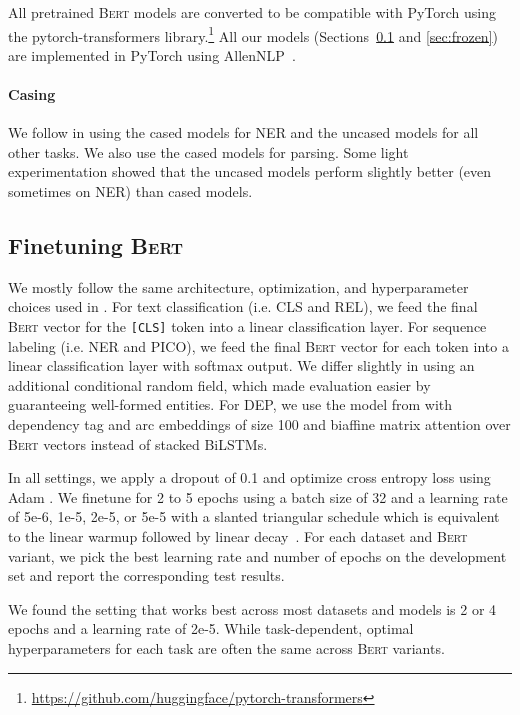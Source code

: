 \documentclass[11pt,a4paper]{article}
\newcommand{\bert}{\textsc{Bert}\xspace}
\begin{document}
All pretrained \bert models are converted to be compatible with PyTorch using the pytorch-transformers library.\footnote{\url{https://github.com/huggingface/pytorch-transformers}}  All our models (Sections~\ref{sec:finetune} and \ref{sec:frozen}) are implemented in PyTorch using AllenNLP~\cite{Gardner2017AllenNLP}.  

\paragraph{Casing}
We follow \citet{Devlin2018BERTPO} in using the cased models for NER and the uncased models for all other tasks.  We also use the cased models for parsing.  Some light experimentation showed that the uncased models perform slightly better (even sometimes on NER) than cased models.


\subsection{Finetuning \bert}
\label{sec:finetune}

We mostly follow the same architecture, optimization, and hyperparameter choices used in \citet{Devlin2018BERTPO}.  For text classification (i.e. CLS and REL), we feed the final \bert vector for the \texttt{[CLS]} token into a linear classification layer.  For sequence labeling (i.e. NER and PICO), we feed the final \bert vector for each token into a linear classification layer with softmax output.  We differ slightly in using an additional conditional random field, which made evaluation easier by guaranteeing well-formed entities.  For DEP, we use the model from \citet{Dozat2017DeepBA} with dependency tag and arc embeddings of size 100 and biaffine matrix attention over \bert vectors instead of stacked BiLSTMs.

In all settings, we apply a dropout of 0.1 and optimize cross entropy loss using Adam \cite{Kingma2015AdamAM}.  We finetune for 2 to 5 epochs using a batch size of 32 and a learning rate of 5e-6, 1e-5, 2e-5, or 5e-5 with a slanted triangular schedule \cite{Howard2018UniversalLM} which is equivalent to the linear warmup followed by linear decay~\cite{Devlin2018BERTPO}.  For each dataset and \bert variant, we pick the best learning rate and number of epochs on the development set and report the corresponding test results.


We found the setting that works best across most datasets and models is 2 or 4 epochs and a learning rate of 2e-5.  While task-dependent, optimal hyperparameters for each task are often the same across \bert variants.
\end{document}
